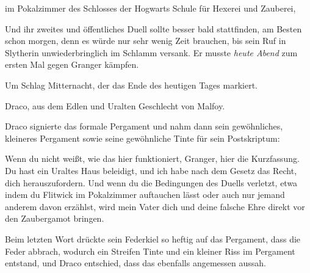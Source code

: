 \begin{writtenNote}
im Pokalzimmer des Schlosses der Hogwarts Schule für Hexerei und Zauberei,
\end{writtenNote}

Und ihr zweites und öffentliches Duell sollte besser bald stattfinden, am Besten schon morgen, denn es würde nur sehr wenig Zeit brauchen, bis sein Ruf in Slytherin unwiederbringlich im Schlamm versank. Er musste \emph{heute Abend} zum ersten Mal gegen Granger kämpfen.

\begin{writtenNote}
Um Schlag Mitternacht, der das Ende des heutigen Tages markiert.

Draco, aus dem Edlen und Uralten Geschlecht von Malfoy.
\end{writtenNote}

Draco signierte das formale Pergament und nahm dann sein gewöhnliches, kleineres Pergament sowie seine gewöhnliche Tinte für sein Postskriptum:

\begin{writtenNote}
Wenn du nicht weißt, wie das hier funktioniert, Granger, hier die Kurzfassung. Du hast ein Uraltes Haus beleidigt, und ich habe nach dem Gesetz das Recht, dich herauszufordern. Und wenn du die Bedingungen des Duells verletzt, etwa indem du Flitwick im Pokalzimmer auftauchen lässt oder auch nur jemand anderem davon erzählst, wird mein Vater dich und deine falsche Ehre direkt vor den Zaubergamot bringen.

\end{writtenNote}

Beim letzten Wort drückte sein Federkiel so heftig auf das Pergament, dass die Feder abbrach, wodurch ein Streifen Tinte und ein kleiner Riss im Pergament entstand, und Draco entschied, dass das ebenfalls angemessen aussah.

